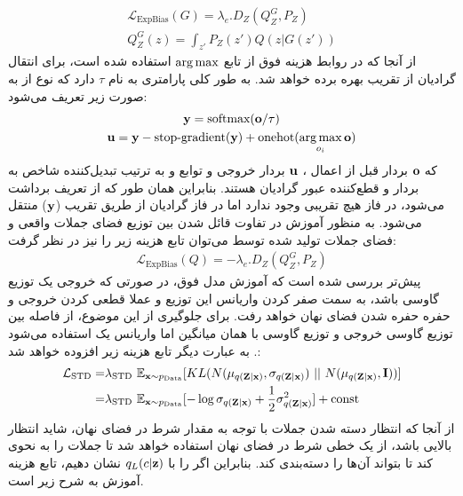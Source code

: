 \begin{gather}
	\mathcal{L}_\text{ExpBias}(G) = \lambda_{e} . D_ Z(Q_Z^G, P_Z)
	\\
	Q_Z^G (z) = \int_{z'} P_Z(z') Q(z|G(z'))
\end{gather}
از آنجا که در روابط هزینه فوق از تابع $\operatorname*{arg\,max}$ استفاده شده است، برای انتقال گرادیان از تقریب  بهره برده خواهد شد.   به طور کلی پارامتری به نام $\tau$ دارد که نوع  از به صورت زیر تعریف می‌شود:
\begin{gather}
	{\bf y} = \text{softmax}({\bf o}/\tau)
	\\
	{\bf u} = {\bf y} - \text{stop-gradient}({\bf y}) + \text{onehot}(\operatorname*{arg\,max}_{o_i} {\bf o})
\end{gather}
که ${\bf o}$ بردار قبل از اعمال 
،
${\bf u}$
بردار خروجی و توابع  و  به ترتیب تبدیل‌کننده شاخص به بردار
و قطع‌کننده عبور گرادیان هستند. بنابراین همان طور که از تعریف برداشت می‌شود، در فاز
هیچ تقریبی وجود ندارد اما در فاز
گرادیان از طریق تقریب 
(${\bf y}$)
منتقل می‌شود.
به منظور آموزش \encoder{} در تفاوت قائل شدن بین توزیع فضای جملات واقعی و فضای جملات تولید شده توسط \decoder{} می‌توان تابع هزینه زیر را نیز در نظر گرفت:
\begin{gather}
	\mathcal{L}_\text{ExpBias}(Q) = -\lambda_{e} . D_ Z(Q_Z^G, P_Z)
\end{gather}
\fi
پیش‌تر بررسی شده است که آموزش مدل فوق، در صورتی که خروجی \encoder{} یک توزیع گاوسی باشد، به سمت صفر کردن واریانس این توزیع و عملا قطعی کردن خروجی \encoder{} و حفره حفره شدن فضای نهان خواهد رفت. برای جلوگیری از این موضوع، از فاصله  بین توزیع گاوسی خروجی \encoder{} و توزیع گاوسی با همان میانگین اما واریانس یک استفاده می‌شود \cite{wasser_text_kl}. به عبارت دیگر تابع هزینه زیر افزوده خواهد شد:
\begin{align}
    {\mathcal{L}}_\text{STD} =& \lambda_\text{STD} ~ \mathbb E_{{\bf x} \sim p_\text{Data}} [
    KL(N({\bf \mu}_{q({\bf Z}|{\bf x})}, {\bf \sigma}_{q({\bf Z}|{\bf x})}) ~ || ~ N({\bf \mu}_{q({\bf Z}|{\bf x})}, {\bf I}) ) ] \nonumber
    \\
    =& \lambda_\text{STD} ~ \mathbb E_{{\bf x} \sim p_\text{Data}} [ 
    -\log {\bf \sigma}_{q({\bf Z}|{\bf x})} + \frac{1}{2} {\bf \sigma}_{q({\bf Z}|{\bf x})}^2 ] + \text{const}
\end{align}
از آنجا که انتظار دسته شدن جملات با توجه به مقدار شرط در فضای نهان، شاید انتظار بالایی باشد، از یک \classifier{} خطی شرط در فضای نهان استفاده خواهد شد تا \encoder{} جملات را به نحوی \encode{} کند تا \classifier{} بتواند آن‌ها را دسته‌بندی کند. بنابراین اگر \classifier{} را با $q_L(c|{\bf z})$ نشان دهیم، تابع هزینه آموزش \classifier{} به شرح زیر است.

